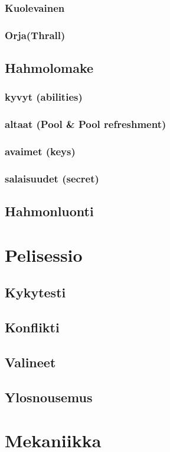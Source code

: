 \documentclass[a4paper, 12pt, finnish]{report}
\begin{document}
{		\subsubsection{Kuolevainen}
		\subsubsection{Orja(Thrall)}
	\subsection{Hahmolomake}
		\subsubsection{kyvyt (abilities)}
		\subsubsection{altaat (Pool \& Pool refreshment)}
		\subsubsection{avaimet (keys)}
		\subsubsection{salaisuudet (secret)}
	\subsection{Hahmonluonti}
\section{Pelisessio}
	\subsection{Kykytesti}
	\subsection{Konflikti}
	\subsection{Valineet}
	\subsection{Ylosnousemus}
\section{Mekaniikka}
}
\end{document}
